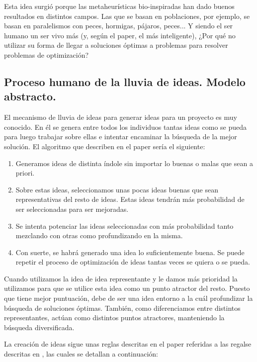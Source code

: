 Esta idea surgió porque las metaheurísticas bio-inspiradas han dado buenos resultados en distintos campos. Las que se basan en poblaciones, por ejemplo, se basan en paralelismos con peces, hormigas, pájaros, peces... Y siendo el ser humano un ser vivo más (y, según el paper, el más inteligente), ¿Por qué no utilizar su forma de llegar a soluciones óptimas a problemas para resolver problemas de optimización?\\

\subsection{Proceso humano de la lluvia de ideas. Modelo abstracto.}

El mecanismo de lluvia de ideas para generar ideas para un proyecto es muy conocido. En él se genera entre todos los individuos tantas ideas como se pueda para luego trabajar sobre ellas e intentar encaminar la búsqueda de la mejor solución. El algoritmo que describen en el paper sería el siguiente:\\

\begin{enumerate}
	\item Generamos ideas de distinta índole sin importar lo buenas o malas que sean a priori.
	\item Sobre estas ideas, seleccionamos unas pocas ideas buenas que sean representativas del resto de ideas. Estas ideas tendrán más probabilidad de ser seleccionadas para ser mejoradas.
	\item Se intenta potenciar las ideas seleccionadas con más probabilidad tanto mezclando con otras como profundizando en la misma.
	\item Con suerte, se habrá generado una idea lo suficientemente buena. Se puede repetir el proceso de optimización de ideas tantas veces se quiera o se pueda.
\end{enumerate}

Cuando utilizamos la idea de idea representante y le damos más prioridad la utilizamos para que se utilice esta idea como un punto atractor del resto. Puesto que tiene mejor puntuación, debe de ser una idea entorno a la cuál profundizar la búsqueda de soluciones óptimas. También, como diferenciamos entre distintos representantes, actúan como distintos puntos atractores, manteniendo la búsqueda diversificada.


La creación de ideas sigue unas reglas descritas en el paper referidas a las regalse descritas en \cite{smith}, las cuales se detallan a continuación: 

